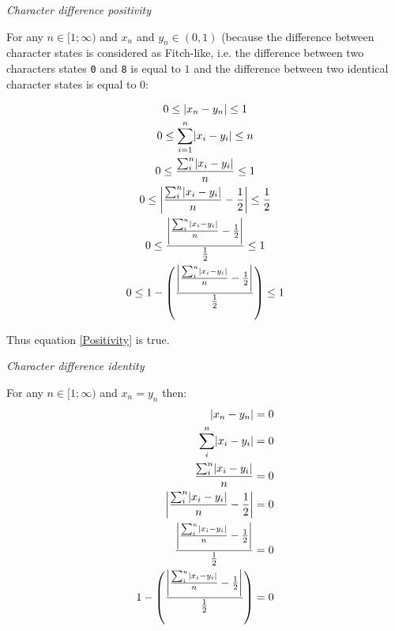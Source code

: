 \documentclass[12pt,letterpaper]{article}
\DeclarePairedDelimiter\abs{\lvert}{\rvert}%
\renewcommand{\subsection}[1]{%
\bigskip
\begin{center}
\begin{large}
\normalfont\itshape #1
\end{large}
\end{center}}
\begin{document}
\subsection{Character difference positivity}

For any $n \in [1;\infty)$ and $x_{n}$ and $y_{n} \in (0,1)$ (because the difference between character states is considered as Fitch-like, i.e. the difference between two characters states \texttt{0} and \texttt{8} is equal to $1$ and the difference between two identical character states is equal to $0$:

\begin{equation}
    \label{positive_demo}
    \begin{gathered}
    0 \leq  \abs{x_{n}-y_{n}} \leq 1\\
    0 \leq  \sum_{i=1}^{n}\abs{x_{i}-y_{i}} \leq n\\
    0 \leq  \frac{\sum_{i}^{n}\abs{x_{i}-y_{i}}}{n} \leq 1\\
    0 \leq  \abs*{\frac{\sum_{i}^{n}\abs{x_{i}-y_{i}}}{n}-\frac{1}{2}} \leq \frac{1}{2}\\
    0 \leq  \frac{\abs*{\frac{\sum_{i}^{n}\abs{x_{i}-y_{i}}}{n}-\frac{1}{2}}}{\frac{1}{2}} \leq 1\\
    0 \leq  1 - \left(\frac{\abs*{\frac{\sum_{i}^{n}\abs{x_{i}-y_{i}}}{n}-\frac{1}{2}}}{\frac{1}{2}}\right) \leq 1\\
    \end{gathered}
\end{equation}

Thus equation \ref{Positivity} is true.

\subsection{Character difference identity}

For any $n \in [1;\infty)$ and $x_{n} = y_{n}$ then:
\begin{equation}
    \label{identitydemo}
    \begin{aligned}
    \abs{x_{n}-y_{n}} &= 0\\
    \sum_{i}^{n}\abs{x_{i}-y_{i}} &= 0\\
    \frac{\sum_{i}^{n}\abs{x_{i}-y_{i}}}{n} &= 0\\
    \abs*{\frac{\sum_{i}^{n}\abs{x_{i}-y_{i}}}{n}-\frac{1}{2}} &= 0\\
    \frac{\abs*{\frac{\sum_{i}^{n}\abs{x_{i}-y_{i}}}{n}-\frac{1}{2}}}{\frac{1}{2}} &= 0\\
    1 - \left(\frac{\abs*{\frac{\sum_{i}^{n}\abs{x_{i}-y_{i}}}{n}-\frac{1}{2}}}{\frac{1}{2}}\right) &= 0\\
    \end{aligned}
\end{equation}
\end{document}
